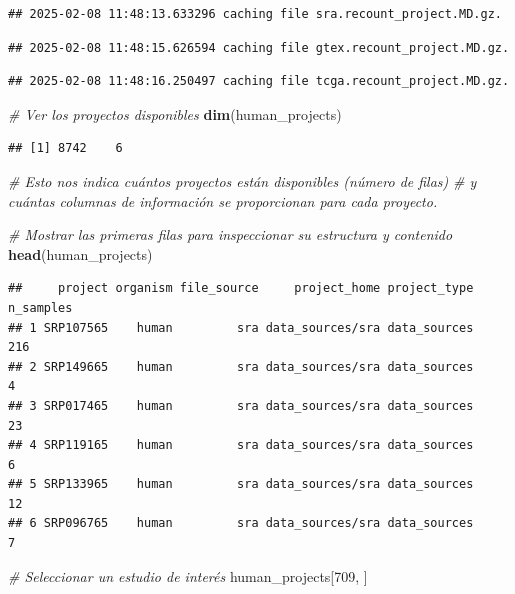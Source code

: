 \documentclass[
]{article}
\newenvironment{Shaded}{\begin{snugshade}}{\end{snugshade}}
\newcommand{\CommentTok}[1]{\textcolor[rgb]{0.56,0.35,0.01}{\textit{#1}}}
\newcommand{\DecValTok}[1]{\textcolor[rgb]{0.00,0.00,0.81}{#1}}
\newcommand{\FunctionTok}[1]{\textcolor[rgb]{0.13,0.29,0.53}{\textbf{#1}}}
\newcommand{\NormalTok}[1]{#1}
\begin{document}
\begin{verbatim}
## 2025-02-08 11:48:13.633296 caching file sra.recount_project.MD.gz.
\end{verbatim}

\begin{verbatim}
## 2025-02-08 11:48:15.626594 caching file gtex.recount_project.MD.gz.
\end{verbatim}

\begin{verbatim}
## 2025-02-08 11:48:16.250497 caching file tcga.recount_project.MD.gz.
\end{verbatim}

\begin{Shaded}
\begin{Highlighting}[]
\CommentTok{\# Ver los proyectos disponibles}
\FunctionTok{dim}\NormalTok{(human\_projects)}
\end{Highlighting}
\end{Shaded}

\begin{verbatim}
## [1] 8742    6
\end{verbatim}

\begin{Shaded}
\begin{Highlighting}[]
\CommentTok{\# Esto nos indica cuántos proyectos están disponibles (número de filas) }
\CommentTok{\# y cuántas columnas de información se proporcionan para cada proyecto.}

\CommentTok{\# Mostrar las primeras filas para inspeccionar su estructura y contenido}
\FunctionTok{head}\NormalTok{(human\_projects)}
\end{Highlighting}
\end{Shaded}

\begin{verbatim}
##     project organism file_source     project_home project_type n_samples
## 1 SRP107565    human         sra data_sources/sra data_sources       216
## 2 SRP149665    human         sra data_sources/sra data_sources         4
## 3 SRP017465    human         sra data_sources/sra data_sources        23
## 4 SRP119165    human         sra data_sources/sra data_sources         6
## 5 SRP133965    human         sra data_sources/sra data_sources        12
## 6 SRP096765    human         sra data_sources/sra data_sources         7
\end{verbatim}

\begin{Shaded}
\begin{Highlighting}[]
\CommentTok{\# Seleccionar un estudio de interés}
\NormalTok{human\_projects[}\DecValTok{709}\NormalTok{, ]}
\end{Highlighting}
\end{Shaded}
\end{document}
